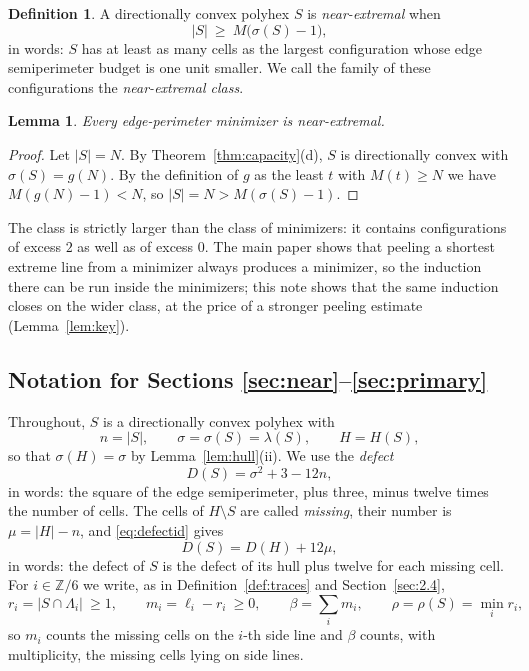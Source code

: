 \documentclass[11pt]{article}
\theoremstyle{plain}
\newtheorem{lemma}[theorem]{Lemma}
\theoremstyle{definition}
\newtheorem{definition}[theorem]{Definition}
\theoremstyle{remark}
\newcommand{\Z}{\mathbb{Z}}
\newcommand{\sm}{\setminus}
\begin{document}
\begin{definition}\label{def:near}
A directionally convex polyhex \(S\) is \emph{near-extremal} when
\[
   |S|\ \ge\ M\bigl(\sigma(S)-1\bigr),
\]
in words: \(S\) has at least as many cells as the largest configuration whose edge
semiperimeter budget is one unit smaller. We call the family of these configurations the
\emph{near-extremal class}.
\end{definition}

\begin{lemma}\label{lem:minnear}
Every edge-perimeter minimizer is near-extremal.
\end{lemma}

\begin{proof}
Let \(|S|=N\). By Theorem~\ref{thm:capacity}(d), \(S\) is directionally convex with
\(\sigma(S)=g(N)\). By the definition of \(g\) as the least \(t\) with \(M(t)\ge N\) we
have \(M(g(N)-1)<N\), so \(|S|=N>M(\sigma(S)-1)\).
\end{proof}

The class is strictly larger than the class of minimizers: it contains configurations of
excess \(2\) as well as of excess \(0\). The main paper shows that peeling a shortest
extreme line from a minimizer always produces a minimizer, so the induction there can be
run inside the minimizers; this note shows that the same induction closes on the wider
class, at the price of a stronger peeling estimate (Lemma~\ref{lem:key}).

\subsection*{Notation for Sections \ref{sec:near}--\ref{sec:primary}}

Throughout, \(S\) is a directionally convex polyhex with
\[
   n=|S|,\qquad \sigma=\sigma(S)=\lambda(S),\qquad H=H(S),
\]
so that \(\sigma(H)=\sigma\) by Lemma~\ref{lem:hull}(ii). We use the \emph{defect}
\begin{equation}\label{eq:defectS}
   D(S)=\sigma^{2}+3-12n ,
\end{equation}
in words: the square of the edge semiperimeter, plus three, minus twelve times the number
of cells. The cells of \(H\sm S\) are called \emph{missing}, their number is
\(\mu=|H|-n\), and \eqref{eq:defectid} gives
\begin{equation}\label{eq:defectsplit}
   D(S)=D(H)+12\mu ,
\end{equation}
in words: the defect of \(S\) is the defect of its hull plus twelve for each missing cell.
For \(i\in\Z/6\) we write, as in Definition~\ref{def:traces} and Section~\ref{sec:2.4},
\[
   r_{i}=|S\cap\Lambda_{i}|\ \ge1,\qquad
   m_{i}=\ell_{i}-r_{i}\ \ge0,\qquad
   \beta=\sum_{i}m_{i},\qquad
   \rho=\rho(S)=\min_{i}r_{i} ,
\]
so \(m_{i}\) counts the missing cells on the \(i\)-th side line and \(\beta\) counts,
with multiplicity, the missing cells lying on side lines.
\end{document}
